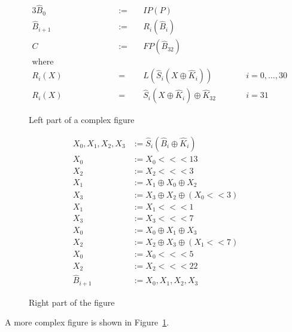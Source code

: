 \begin{figure}
\centering
\footnotesize
\begin{minipage}[b]{0.50\textwidth}
\centering
\begin{alignat*}{3}
	\hat B_0     & := &\;& IP(P)           \\
	\hat B_{i+1} & := &&   R_i(\hat B_i)   \\
	C            & := &&   FP(\hat B_{32}) \\
	\text{where~~~~~~~~~~~~~~~~~~~~~}      \\
	R_i(X)       & =  &&   L(\hat S_i(X \oplus \hat K_i))
						&\qquad& i = 0, \ldots, 30 \\
	R_i(X)       & =  &&   \hat S_i(X \oplus \hat K_i) \oplus \hat K_{32}
						&& i = 31
\end{alignat*}
\caption{Left part of a complex figure}
\label{fig:serpentcode}
\end{minipage}
\hspace{0.25cm}
\vline
\hspace{0.25cm}
\begin{minipage}[b]{0.40\textwidth}
\centering
\begin{align*}
	X_0,X_1,X_2,X_3 & := \hat S_i(\hat B_i \oplus \hat K_i) \\
	X_0             & := X_0 <<< 13 \\
	X_2             & := X_2 <<< 3 \\
	X_1             & := X_1 \oplus X_0 \oplus X_2 \\
	X_3             & := X_3 \oplus X_2 \oplus (X_0 << 3) \\
	X_1             & := X_1 <<< 1 \\
	X_3             & := X_3 <<< 7 \\
	X_0             & := X_0 \oplus X_1 \oplus X_3 \\
	X_2             & := X_2 \oplus X_3 \oplus (X_1 << 7) \\
	X_0             & := X_0 <<< 5 \\
	X_2             & := X_2 <<< 22 \\
	\hat B_{i+1}    & := X_0,X_1,X_2,X_3
\end{align*}
\caption{Right part of the figure}
\label{fig:serpentlin}
\end{minipage}
\end{figure}

A more complex figure is shown in Figure~\ref{fig:serpentlin}. \blindtext





